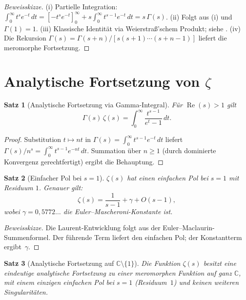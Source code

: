 \documentclass[12pt,a4paper]{amsart}
\newtheorem{theorem}{Satz}[section]
\theoremstyle{definition}
\newcommand{\C}{\mathbb{C}}
\DeclareMathOperator{\Re}{Re}
\begin{document}
\begin{proof}[Beweisskizze]
(i) Partielle Integration: $\int_0^\infty t^s e^{-t}\,dt
= [-t^s e^{-t}]_0^\infty + s\int_0^\infty t^{s-1}e^{-t}\,dt = s\,\Gamma(s)$.
(ii) Folgt aus (i) und $\Gamma(1) = 1$.
(iii) Klassische Identit\"at via Weierstra\ss'schem Produkt; siehe \cite{Ahlfors1979}.
(iv) Die Rekursion $\Gamma(s) = \Gamma(s+n)/[s(s+1)\cdots(s+n-1)]$ liefert
die meromorphe Fortsetzung.
\end{proof}

\section{Analytische Fortsetzung von \texorpdfstring{$\zeta$}{zeta}}

\begin{theorem}[Analytische Fortsetzung via Gamma-Integral]
\label{thm:continuation}
F\"ur $\Re(s) > 1$ gilt
\[
  \Gamma(s)\,\zeta(s) = \int_0^{\infty} \frac{t^{s-1}}{e^t - 1}\,dt.
\]
\end{theorem}

\begin{proof}
Substitution $t \mapsto nt$ in $\Gamma(s) = \int_0^\infty t^{s-1}e^{-t}\,dt$
liefert $\Gamma(s)/n^s = \int_0^\infty t^{s-1}e^{-nt}\,dt$.
Summation \"uber $n \ge 1$ (durch dominierte Konvergenz gerechtfertigt)
ergibt die Behauptung.
\end{proof}

\begin{theorem}[Einfacher Pol bei $s=1$]
\label{thm:pole}
$\zeta(s)$ hat einen einfachen Pol bei $s = 1$ mit Residuum $1$.
Genauer gilt:
\[
  \zeta(s) = \frac{1}{s-1} + \gamma + O(s-1),
\]
wobei $\gamma = 0{,}5772\ldots$ die Euler--Mascheroni-Konstante ist.
\end{theorem}

\begin{proof}[Beweisskizze]
Die Laurent-Entwicklung folgt aus der Euler--Maclaurin-Summenformel.
Der f\"uhrende Term liefert den einfachen Pol; der Konstantterm ergibt~$\gamma$.
\end{proof}

\begin{theorem}[Analytische Fortsetzung auf $\C \setminus \{1\}$]
\label{thm:full_continuation}
Die Funktion $\zeta(s)$ besitzt eine eindeutige analytische Fortsetzung
zu einer meromorphen Funktion auf ganz $\C$, mit einem einzigen einfachen
Pol bei $s = 1$ (Residuum~$1$) und keinen weiteren Singularit\"aten.
\end{theorem}
\end{document}
